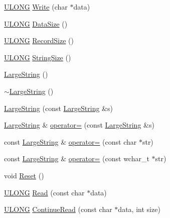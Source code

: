 \begin{DoxyCompactItemize}
\item 
\hyperlink{_basic_excel_8hpp_abe09d1bea023be6a07cbadde8e955435}{U\+L\+O\+N\+G} \hyperlink{struct_y_excel_1_1_large_string_a81b161a6af9982d9759f1bd2c3d532cc}{Write} (char $\ast$data)
\item 
\hyperlink{_basic_excel_8hpp_abe09d1bea023be6a07cbadde8e955435}{U\+L\+O\+N\+G} \hyperlink{struct_y_excel_1_1_large_string_a4ef217150110ed9d5edc6dc21ff53aa3}{Data\+Size} ()
\item 
\hyperlink{_basic_excel_8hpp_abe09d1bea023be6a07cbadde8e955435}{U\+L\+O\+N\+G} \hyperlink{struct_y_excel_1_1_large_string_a2b3b65375a3acfd892423c5e071b18d5}{Record\+Size} ()
\item 
\hyperlink{_basic_excel_8hpp_abe09d1bea023be6a07cbadde8e955435}{U\+L\+O\+N\+G} \hyperlink{struct_y_excel_1_1_large_string_a87829b1124c6865aec809b3f05675fe8}{String\+Size} ()
\item 
\hyperlink{struct_y_excel_1_1_large_string_a8020faa48b2977504d1a5f80637d6fea}{Large\+String} ()
\item 
\hyperlink{struct_y_excel_1_1_large_string_a53e799a2dc1a4572868b7dc86b45c7f0}{$\sim$\+Large\+String} ()
\item 
\hyperlink{struct_y_excel_1_1_large_string_a11e79354ea7627ff1b9664f2c9d2e7f4}{Large\+String} (const \hyperlink{struct_y_excel_1_1_large_string}{Large\+String} \&s)
\item 
\hyperlink{struct_y_excel_1_1_large_string}{Large\+String} \& \hyperlink{struct_y_excel_1_1_large_string_ad78633d4604e68b5947099f1af1ace5d}{operator=} (const \hyperlink{struct_y_excel_1_1_large_string}{Large\+String} \&s)
\item 
const \hyperlink{struct_y_excel_1_1_large_string}{Large\+String} \& \hyperlink{struct_y_excel_1_1_large_string_a0fcd130631b3545123bb21328b2808f5}{operator=} (const char $\ast$str)
\item 
const \hyperlink{struct_y_excel_1_1_large_string}{Large\+String} \& \hyperlink{struct_y_excel_1_1_large_string_a98f06130244ead2fa0faee307304e160}{operator=} (const wchar\+\_\+t $\ast$str)
\item 
void \hyperlink{struct_y_excel_1_1_large_string_abf0c63f8ce9aa109a2f5acf9c3b991d7}{Reset} ()
\item 
\hyperlink{_basic_excel_8hpp_abe09d1bea023be6a07cbadde8e955435}{U\+L\+O\+N\+G} \hyperlink{struct_y_excel_1_1_large_string_a6f180b65063bfd33b6132d3402d22411}{Read} (const char $\ast$data)
\item 
\hyperlink{_basic_excel_8hpp_abe09d1bea023be6a07cbadde8e955435}{U\+L\+O\+N\+G} \hyperlink{struct_y_excel_1_1_large_string_a1f3446cdbfaeb247b7c73d01085876a2}{Continue\+Read} (const char $\ast$data, int size)

\end{DoxyCompactItemize}

